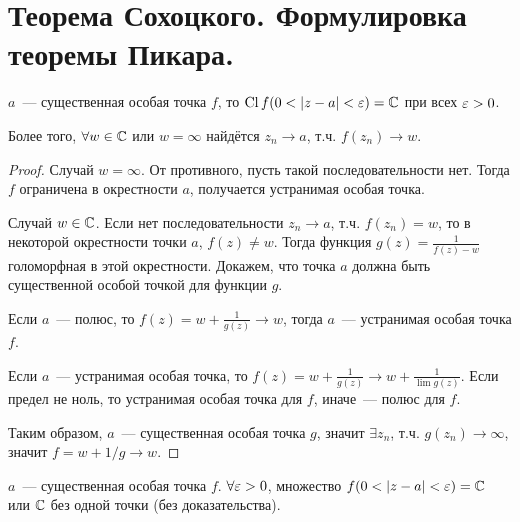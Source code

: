 \section{Теорема Сохоцкого. Формулировка теоремы Пикара.}

\begin{theorem}[Сохоцкий]

    $a$~--- существенная особая точка $f$,
    то $\operatorname{Cl} f(0 < |z-a| < \varepsilon) = \mathbb{C}$ при всех $\varepsilon > 0$.

    Более того, $\forall w \in \mathbb{C}$ или $w = \infty$
    найдётся $z_n \to a$, т.ч. $f(z_n) \to w$.
\end{theorem}

\begin{proof}
    Случай $w = \infty$.
    От противного, пусть такой последовательности нет.
    Тогда $f$ ограничена в окрестности $a$,
    получается устранимая особая точка.

    Случай $w \in \mathbb{C}$.
    Если нет последовательности $z_n \to a$,
    т.ч. $f(z_n) = w$, то в некоторой окрестности
    точки $a$, $f(z) \ne w$. Тогда функция
    $g(z) = \frac{1}{f(z) - w}$ голоморфная в
    этой окрестности.
    Докажем, что точка $a$ должна быть существенной
    особой точкой для функции $g$.

    Если $a$~--- полюс, то $f(z) = w + \frac{1}{g(z)}
        \to w$, тогда $a$~--- устранимая особая точка $f$.

    Если $a$~--- устранимая особая точка, то
    $f(z) = w + \frac{1}{g(z)} \to w + \frac{1}{\lim g(z)}$.
    Если предел не ноль, то устранимая особая точка для $f$,
    иначе~--- полюс для $f$.

    Таким образом, $a$~--- существенная особая точка $g$,
    значит $\exists z_n$, т.ч. $g(z_n) \to \infty$,
    значит $f = w + 1/g \to w$.
\end{proof}

\begin{theorem}[Пикар]

    $a$~--- существенная особая точка $f$.
    $\forall \varepsilon > 0$, множество $f(0 < |z-a| < \varepsilon)
        = \mathbb{C}$ или $\mathbb{C}$ без одной точки (без доказательства).
\end{theorem}

\newpage

